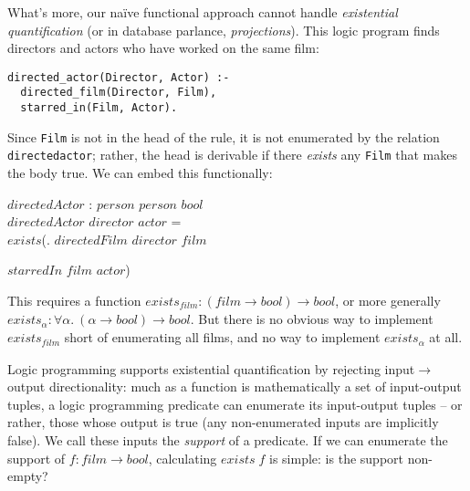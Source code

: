 \documentclass[sigplan,screen,dvipsnames,fleqn]{acmart}
\makeatletter
\newlength{\negph@wd}
\DeclareRobustCommand{\negphantom}[1]{%
  \ifmmode
    \mathpalette\negph@math{#1}%
  \else
    \negph@do{#1}%
  \fi
}
\newcommand{\negph@math}[2]{\negph@do{$\m@th#1#2$}}
\newcommand{\negph@do}[1]{%
  \settowidth{\negph@wd}{#1}%
  \hspace*{-\negph@wd}%
}\makeatother
\newcommand\name[1]{\ensuremath{\mathit{#1}}}
\newcommand\fnspace{\;}
\newcommand\fn[1]{\lambda{#1}.\fnspace}
\newcommand\<\;                 %
\newcommand\tbool{\name{bool}}
\newcommand\tand{\mathrel{\mathbf{and}}}
\makeatother
\begin{document}
\noindent
What's more, our na\"ive functional approach cannot handle \emph{existential quantification} (or in database parlance, \emph{projections}). This logic program finds directors and actors who have worked on the same film:

\begin{lstlisting}
directed_actor(Director, Actor) :-
  directed_film(Director, Film),
  starred_in(Film, Actor).
\end{lstlisting}

\noindent
Since \texttt{Film} is not in the head of the rule, it is not enumerated by the relation \texttt{directed\textunderscore{}actor}; rather, the head is derivable if there \emph{exists} any \texttt{Film} that makes the body true.
We can embed this functionally:

\begin{code}
\name{directedActor} : \name{person} \to \name{person} \to \tbool\\
\name{directedActor} \<\name{director} \<\name{actor} =\\
\quad \name{exists}\<(\fn{\name{film}} \name{directedFilm} \<\name{director} \<\name{film}
\\
\quad \phantom{\name{exists}\<(\fn{\name{film}}}
\negphantom{{}\tand{}}
\tand \name{starredIn} \<\name{film} \<\name{actor})
\end{code}

\noindent
This requires a function $\name{exists}_{\name{film}} : (\name{film} \to \tbool) \to \tbool$, or more generally $\name{exists}_\alpha : \forall\alpha.\ (\alpha \to \tbool) \to \tbool$.
But there is no obvious way to implement $\name{exists}_{\name{film}}$ short of enumerating all films, and no way to implement $\name{exists}_\alpha$ at all.

Logic programming supports existential quantification by rejecting input$\rightarrow$output directionality:
much as a function is mathematically a set of input-output tuples, a logic programming predicate can enumerate its input-output tuples -- or rather, those whose output is true (any non-enumerated inputs are implicitly false).
%
We call these inputs the \emph{support} of a predicate.
%
If we can enumerate the support of $f : \name{film} \to \tbool$, calculating $\name{exists}\<f$ is simple: is the support non-empty?
\end{document}

